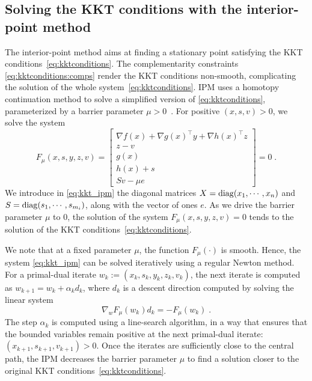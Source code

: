 \subsection{Solving the KKT conditions with the interior-point method}
\label{sec:ipm:kkt}
The interior-point method aims at finding a stationary point
satisfying the KKT conditions~\eqref{eq:kktconditions}.
The complementarity constraints \eqref{eq:kktconditions:comps}
render the KKT conditions non-smooth, complicating the solution of
the whole system~\eqref{eq:kktconditions}.
IPM uses a homotopy continuation method to solve a simplified
version of \eqref{eq:kktconditions}, parameterized by a barrier
parameter $\mu > 0$~\cite[Chapter 19]{nocedal_numerical_2006}.
For positive $(x, s, v) > 0$, we solve the system
\begin{equation}
  \label{eq:kkt_ipm}
  F_\mu(x, s, y, z, v) =
  \begin{bmatrix}
       \nabla f(x) + \nabla g(x)^\top y + \nabla h(x)^\top z   \\
       z - v  \\
       g(x)  \\
       h(x) + s  \\
       S v - \mu e
  \end{bmatrix} = 0
   \; .
\end{equation}
We introduce in \eqref{eq:kkt_ipm} the diagonal matrices $X = \operatorname{diag}(x_1, \cdots, x_n)$
and $S = \operatorname{diag}(s_1, \cdots, s_{m_i})$, along with the vector of ones $e$.
As we drive the barrier parameter $\mu$ to $0$, the solution of the
system $F_\mu(x, s, y, z, v) = 0$ tends to the solution of the
KKT conditions~\eqref{eq:kktconditions}.

We note that at a fixed parameter $\mu$, the function $F_\mu(\cdot)$
is smooth. Hence, the system \eqref{eq:kkt_ipm} can be solved iteratively
using a regular Newton method. For a primal-dual iterate
$w_k := (x_k, s_k, y_k, z_k, v_k)$, the next iterate is computed as
$w_{k+1} = w_k + \alpha_k d_k$, where $d_k$ is a descent
direction computed by solving the linear system
\begin{equation}
  \label{eq:newton_step}
  \nabla_w F_{\mu}(w_k) d_k = -F_{\mu}(w_k) \; .
\end{equation}
The step $\alpha_k$ is computed using a line-search algorithm, in a way
that ensures that the bounded variables remain positive
at the next primal-dual iterate: $(x_{k+1}, s_{k+1}, v_{k+1}) > 0$.
Once the iterates are sufficiently close to the central path,
the IPM decreases the barrier parameter $\mu$ to find a solution closer to
the original KKT conditions~\eqref{eq:kktconditions}.

